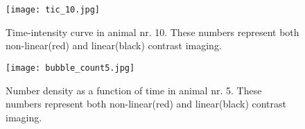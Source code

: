 \begin{figure}[h]
	\centering
	\texttt{[image: tic\_10.jpg]}
	\caption{Time-intensity curve in animal nr. 10. These numbers represent both non-linear(red) and linear(black) contrast imaging.}
	\label{Fig:tic}
\end{figure}

\begin{figure}[h]
	\centering
	\texttt{[image: bubble\_count5.jpg]}
	\caption{Number density as a function of time in animal nr. 5. These numbers represent both non-linear(red) and linear(black) contrast imaging.}
	\label{Fig:tic_count}
\end{figure}
\clearpage



